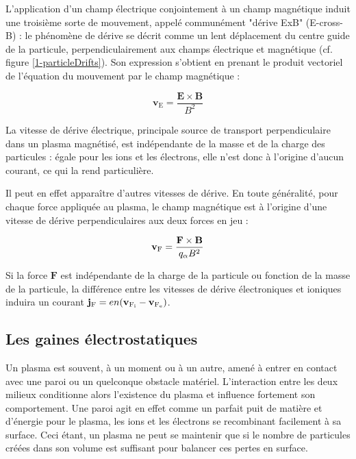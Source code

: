 \begin{refsection}
L'application d'un champ électrique conjointement à un champ magnétique
induit une troisième sorte de mouvement, appelé communément "dérive
ExB" (E-cross-B) : le phénomène de dérive se décrit comme un lent déplacement du
centre guide de la particule, perpendiculairement aux champs électrique et
magnétique (cf. figure \ref{1-particleDrifts}). Son expression s'obtient en
prenant le produit vectoriel de l'équation du mouvement par le champ magnétique
:

\begin{equation}
\mathbf{v}_\text{E}=\frac{\mathbf{E}\times\mathbf{B}}{B^2}
\end{equation}

La vitesse de dérive électrique, principale source de transport perpendiculaire
dans un plasma magnétisé, est indépendante de la masse et de la charge des
particules : égale pour les ions et les électrons, elle n'est donc à
l'origine d'aucun courant, ce qui la rend particulière. 

Il peut en effet apparaître d'autres vitesses de dérive. En toute généralité, 
pour chaque force appliquée au plasma, le champ magnétique est à l'origine
d'une vitesse de dérive perpendiculaires aux deux forces en jeu :

\begin{equation}
\mathbf{v}{_{\text{F}}}=\frac{\mathbf{F}\times\mathbf{B}}{q_\alpha B^2}
\end{equation}

Si la force $\mathbf F$ est indépendante de la charge de la particule ou
fonction de la masse de la particule, la différence entre les vitesses de dérive
électroniques et ioniques induira un courant $\mathbf
j{_{\text{F}}}=en(\mathbf v{_{\text{F}_\text{i}}}-\mathbf
v{_{\text{F}_\text{e}}})$. 

\subsection{Les gaines électrostatiques}
\label{1-gaines}
Un plasma est souvent, à un moment ou à un autre, amené à entrer en contact avec
une paroi ou un quelconque obstacle matériel. L'interaction entre
les deux milieux conditionne alors l'existence du plasma et influence
fortement son comportement. Une paroi agit en effet comme un parfait
puit de matière et d'énergie pour le plasma, les ions et les électrons se
recombinant facilement à sa surface. Ceci étant, un plasma ne peut se maintenir
que si le nombre de particules créées dans son volume est suffisant pour
balancer ces pertes en surface. 


\end{refsection}
